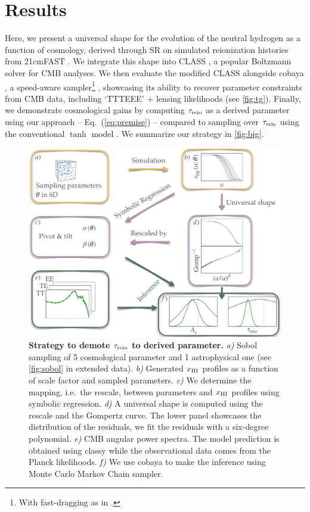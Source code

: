 \section*{Results}

Here, we present a universal shape for the evolution of the neutral
hydrogen as a function of cosmology, derived through SR on simulated
reionization histories from 21cmFAST \cite{Murray2020}.
We integrate this shape into CLASS \cite{Blas2011}, a popular Boltzmann
solver for CMB analyses.
We then evaluate the modified CLASS alongside cobaya \cite{Torrado2020},
a speed-aware sampler\footnote{With fast-dragging as in
\cite{Neal2005}.} \cite{Lewis2002, Lewis2013}, showcasing its ability to
recover parameter constraints from CMB data, including `TTTEEE' +
lensing likelihoods \cite{Planck2020c, Planck2020d} (see
\autoref{fig:tg}).
Finally, we demonstrate cosmological gains by computing $\tau_{\mathrm{reio}}$ as
a derived parameter using our approach -- Eq.~(\ref{eq:premise}) --
compared to sampling over $\tau_{\mathrm{reio}}$ using the conventional $\tanh$
model \cite{Lewis2008}.
We summarize our strategy in \autoref{fig:big}.

\begin{figure}
\centering
\includegraphics[width=\linewidth]{figs/big_fig.pdf}
\caption{\textbf{Strategy to demote $\tau_{\mathrm{reio}}$ to derived parameter.}
\emph{a)} Sobol sampling of 5 cosmological parameter and 1 astrophysical
one (see \autoref{fig:sobol} in extended data).
\emph{b)} Generated $x_{\mathrm{HI}}$ profiles as a function of scale factor and
sampled parameters.
\emph{c)} We determine the mapping, i.e.\ the rescale, between
parameters and $x_{\mathrm{HI}}$ profiles using symbolic regression.
\emph{d)} A universal shape is computed using the rescale and the
Gompertz curve.
The lower panel showcases the distribution of the residuals, we fit the
residuals with a six-degree polynomial.
\emph{e)}  CMB angular power spectra.
The model prediction is obtained using classy while the observational
data comes from the Planck likelihoods.
\emph{f)} We use cobaya to make the inference using Monte Carlo Markov
Chain sampler.}
\label{fig:big}
\end{figure}

